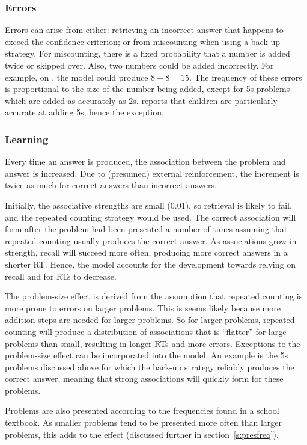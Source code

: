 \subsubsection{Errors}

Errors can arise from either: retrieving an incorrect answer that happens to
exceed the confidence criterion; or from miscounting when using a back-up
strategy.  For miscounting, there is a fixed probability that a number is
added twice or skipped over.  Also, two numbers could be added incorrectly.
For example, on , the model could produce $8+8=15$.  The frequency
of these
errors is proportional to the size of the number being added,  except for
5s problems which are added as accurately as 2s.  \citeauthor{siegmult}
reports that children are particularly accurate at adding 5s, hence the
exception.

\subsubsection{Learning}

Every time an answer is produced, the association between the problem and
answer is increased.  Due to (presumed) external reinforcement, the
increment is twice as much for correct answers than incorrect answers.

Initially, the associative strengths are small (0.01), so retrieval is
likely to fail, and the repeated counting strategy would be used.
The correct association will form after the problem had been presented a
number of times assuming that repeated counting usually produces the
correct answer.  As associations grow in strength, recall will succeed
more often, producing more correct answers in a shorter RT\@.  Hence,
the model accounts for the
development towards relying on recall and for RTs to decrease.

The problem-size effect is derived from the assumption that repeated
counting is more prone to errors on larger problems.  This is
seems likely because more addition steps are needed for larger problems.
So for larger
problems, repeated
counting will produce a distribution of associations that is ``flatter''
for large problems than small, resulting in longer RTs and more
errors.  Exceptions to the problem-size effect can be incorporated into the
model. An
example is the 5s problems discussed above for which the back-up
strategy reliably produces the correct answer, meaning that strong
associations will quickly form for these problems.

Problems are also presented according to the frequencies found in a school
textbook.  As smaller problems tend to be presented more often than larger
problems, this adds to the effect (discussed further in
section~\ref{s:presfreq}).

